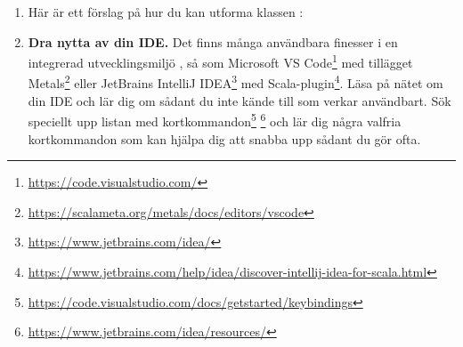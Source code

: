 \begin{enumerate}[leftmargin=*]
\item Här är ett förslag på hur du kan utforma klassen :
%
%
%
%
%
%
%
%
%
%

\item \textbf{Dra nytta av din IDE.} Det finns många användbara finesser i en integrerad utvecklingsmiljö , så som Microsoft VS Code\footnote{\url{https://code.visualstudio.com/}} med tillägget Metals\footnote{\url{https://scalameta.org/metals/docs/editors/vscode}} eller JetBrains IntelliJ IDEA\footnote{\url{https://www.jetbrains.com/idea/}} med Scala-plugin\footnote{\url{https://www.jetbrains.com/help/idea/discover-intellij-idea-for-scala.html}}. Läsa på nätet om din IDE och lär dig om sådant du inte kände till som verkar användbart. Sök speciellt upp listan med kortkommandon\footnote{\url{https://code.visualstudio.com/docs/getstarted/keybindings}} \footnote{\url{https://www.jetbrains.com/idea/resources/}}  och lär dig några valfria kortkommandon som kan hjälpa dig att snabba upp sådant du gör ofta. 
\end{enumerate}
